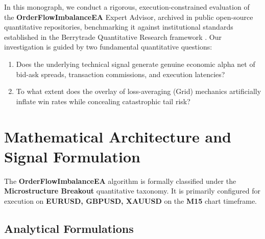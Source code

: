 \documentclass[11pt,a4paper]{article}
\begin{document}
In this monograph, we conduct a rigorous, execution-constrained evaluation of the \textbf{OrderFlowImbalanceEA} Expert Advisor, archived in public open-source quantitative repositories, benchmarking it against institutional standards established in the Berrytrade Quantitative Research framework \cite{artsu2026illusion}. Our investigation is guided by two fundamental quantitative questions:
\begin{enumerate}
    \item Does the underlying technical signal generate genuine economic alpha net of bid-ask spreads, transaction commissions, and execution latencies?
    \item To what extent does the overlay of loss-averaging (Grid) mechanics artificially inflate win rates while concealing catastrophic tail risk?
\end{enumerate}

\section{Mathematical Architecture and Signal Formulation}
The \textbf{OrderFlowImbalanceEA} algorithm is formally classified under the \textbf{Microstructure Breakout} quantitative taxonomy. It is primarily configured for execution on \textbf{EURUSD, GBPUSD, XAUUSD} on the \textbf{M15} chart timeframe.

\subsection{Analytical Formulations}
\end{document}

